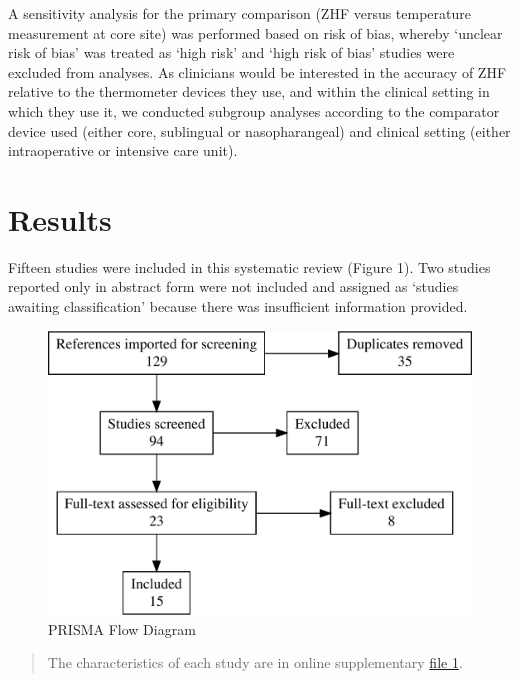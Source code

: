 \documentclass[smallextended]{svjour3}       %
\begin{document}
A sensitivity analysis for the primary comparison (ZHF versus
temperature measurement at core site) was performed based on risk of
bias, whereby `unclear risk of bias' was treated as `high risk' and
`high risk of bias' studies were excluded from analyses. As clinicians
would be interested in the accuracy of ZHF relative to the thermometer
devices they use, and within the clinical setting in which they use it,
we conducted subgroup analyses according to the comparator device used
(either core, sublingual or nasopharangeal) and clinical setting (either
intraoperative or intensive care unit).

\hypertarget{results}{%
\section{Results}\label{results}}

Fifteen studies were included in this systematic review (Figure 1). Two
studies reported only in abstract form were not included and assigned as
`studies awaiting classification' because there was insufficient
information provided.

\begin{figure}

{\centering \includegraphics{zhf_manuscript_files/figure-latex/fig-1-1} 

}

\caption{PRISMA Flow Diagram}\label{fig:fig-1}
\end{figure}

\begin{quote}
The characteristics of each study are in online supplementary
\href{link\%20to\%20file\%201}{file 1}.
\end{quote}
\end{document}

